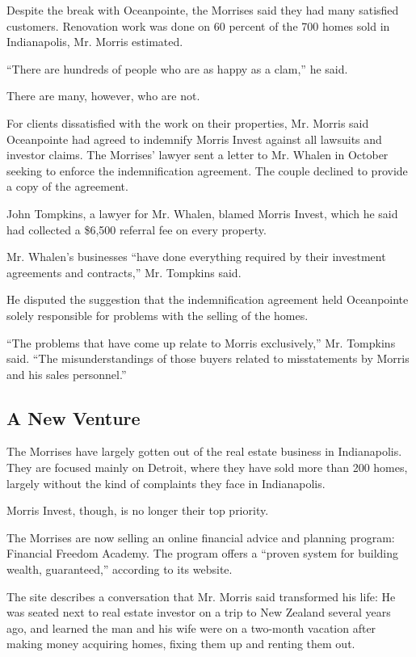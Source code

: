 Despite the break with Oceanpointe, the Morrises said they had many
satisfied customers. Renovation work was done on 60 percent of the 700
homes sold in Indianapolis, Mr. Morris estimated.

``There are hundreds of people who are as happy as a clam,'' he said.

There are many, however, who are not.

For clients dissatisfied with the work on their properties, Mr. Morris
said Oceanpointe had agreed to indemnify Morris Invest against all
lawsuits and investor claims. The Morrises' lawyer sent a letter to Mr.
Whalen in October seeking to enforce the indemnification agreement. The
couple declined to provide a copy of the agreement.

John Tompkins, a lawyer for Mr. Whalen, blamed Morris Invest, which he
said had collected a \$6,500 referral fee on every property.

Mr. Whalen's businesses ``have done everything required by their
investment agreements and contracts,'' Mr. Tompkins said.

He disputed the suggestion that the indemnification agreement held
Oceanpointe solely responsible for problems with the selling of the
homes.

``The problems that have come up relate to Morris exclusively,'' Mr.
Tompkins said. ``The misunderstandings of those buyers related to
misstatements by Morris and his sales personnel.''

\hypertarget{a-new-venture}{%
\subsection{A New Venture}\label{a-new-venture}}

The Morrises have largely gotten out of the real estate business in
Indianapolis. They are focused mainly on Detroit, where they have sold
more than 200 homes, largely without the kind of complaints they face in
Indianapolis.

Morris Invest, though, is no longer their top priority.

The Morrises are now selling an online financial advice and planning
program: Financial Freedom Academy. The program offers a ``proven system
for building wealth, guaranteed,'' according to its website.

The site describes a conversation that Mr. Morris said transformed his
life: He was seated next to real estate investor on a trip to New
Zealand several years ago, and learned the man and his wife were on a
two-month vacation after making money acquiring homes, fixing them up
and renting them out.

